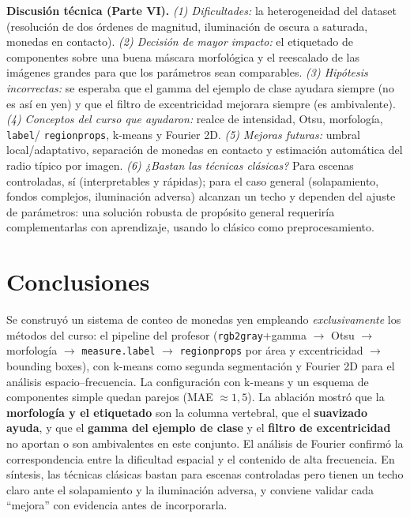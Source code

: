 \documentclass[11pt,a4paper]{article}
\newcommand{\code}[1]{\texttt{#1}}
\begin{document}
\textbf{Discusión técnica (Parte VI).}
\emph{(1) Dificultades:} la heterogeneidad del dataset (resolución de dos órdenes de magnitud, iluminación
de oscura a saturada, monedas en contacto). \emph{(2) Decisión de mayor impacto:} el etiquetado de
componentes sobre una buena máscara morfológica y el reescalado de las imágenes grandes para que los
parámetros sean comparables. \emph{(3) Hipótesis incorrectas:} se esperaba que el gamma del ejemplo de
clase ayudara siempre (no es así en yen) y que el filtro de excentricidad mejorara siempre (es ambivalente).
\emph{(4) Conceptos del curso que ayudaron:} realce de intensidad, Otsu, morfología, \code{label}/
\code{regionprops}, k-means y Fourier 2D. \emph{(5) Mejoras futuras:} umbral local/adaptativo, separación
de monedas en contacto y estimación automática del radio típico por imagen. \emph{(6) ¿Bastan las técnicas
clásicas?} Para escenas controladas, sí (interpretables y rápidas); para el caso general (solapamiento,
fondos complejos, iluminación adversa) alcanzan un techo y dependen del ajuste de parámetros: una solución
robusta de propósito general requeriría complementarlas con aprendizaje, usando lo clásico como
preprocesamiento.

\section{Conclusiones}

Se construyó un sistema de conteo de monedas yen empleando \emph{exclusivamente} los métodos del curso: el
pipeline del profesor (\code{rgb2gray}+gamma $\rightarrow$ Otsu $\rightarrow$ morfología $\rightarrow$
\code{measure.label} $\rightarrow$ \code{regionprops} por área y excentricidad $\rightarrow$ bounding
boxes), con k-means como segunda segmentación y Fourier 2D para el análisis espacio--frecuencia. La
configuración con k-means y un esquema de componentes simple quedan parejos (MAE $\approx 1{,}5$). La
ablación mostró que la \textbf{morfología y el etiquetado} son la columna vertebral, que el \textbf{suavizado
ayuda}, y que el \textbf{gamma del ejemplo de clase} y el \textbf{filtro de excentricidad} no aportan o son
ambivalentes en este conjunto. El análisis de Fourier confirmó la correspondencia entre la dificultad
espacial y el contenido de alta frecuencia. En síntesis, las técnicas clásicas bastan para escenas
controladas pero tienen un techo claro ante el solapamiento y la iluminación adversa, y conviene validar
cada ``mejora'' con evidencia antes de incorporarla.
\end{document}
